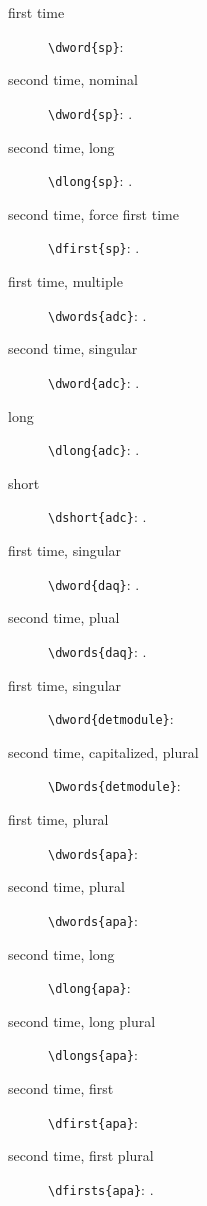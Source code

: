 \documentclass{article}
\begin{document}
\begin{description}

\item[first time] \verb|\dword{sp}|: 

\item[second time, nominal] \verb|\dword{sp}|: .

\item[second time, long] \verb|\dlong{sp}|: .

\item[second time, force first time] \verb|\dfirst{sp}|: .

\item[first time, multiple] \verb|\dwords{adc}|: .

\item[second time, singular] \verb|\dword{adc}|: .

\item[long] \verb|\dlong{adc}|: .

\item[short] \verb|\dshort{adc}|: .

\item[first time, singular] \verb|\dword{daq}|: .

\item[second time, plual] \verb|\dwords{daq}|: .

\item[first time, singular] \verb|\dword{detmodule}|: 

\item[second time, capitalized, plural] \verb|\Dwords{detmodule}|: 

\item[first time, plural] \verb|\dwords{apa}|: 

\item[second time, plural] \verb|\dwords{apa}|: 

\item[second time, long] \verb|\dlong{apa}|: 

\item[second time, long plural] \verb|\dlongs{apa}|: 

\item[second time, first] \verb|\dfirst{apa}|: 

\item[second time, first plural] \verb|\dfirsts{apa}|: .

\end{description}
\end{document}
